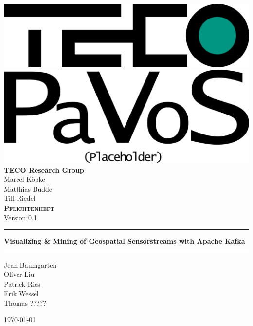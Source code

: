 \begin{titlepage}
	\begin{center}
	\includegraphics[width=0.5\linewidth]{images/TECOLogo.png}\\[0.5cm]
	\includegraphics[width=0.5\linewidth]{images/PaVoSLogo.png}\\[1cm]
	\textbf{TECO Research Group}\\[0.2cm]
	Marcel Köpke\\Matthias Budde\\Till Riedel\\[2cm]
	
	
	\textsc{\textbf{\LARGE Pflichtenheft}}\\
	{\small Version 0.1}\\
	
	\vspace{1cm}\hrule\vspace{0.4cm}
	\textbf{\huge Visualizing \& Mining of Geospatial Sensorstreams with Apache Kafka}\\
	\vspace{0.4cm}\hrule\vspace{1cm}
	
	{\Large Jean Baumgarten\\
	Oliver Liu\\
	Patrick Ries\\
	Erik Wessel\\
	Thomas ?????\\}
	\vspace{1.5cm}

	\today
	
	\end{center}
\end{titlepage}